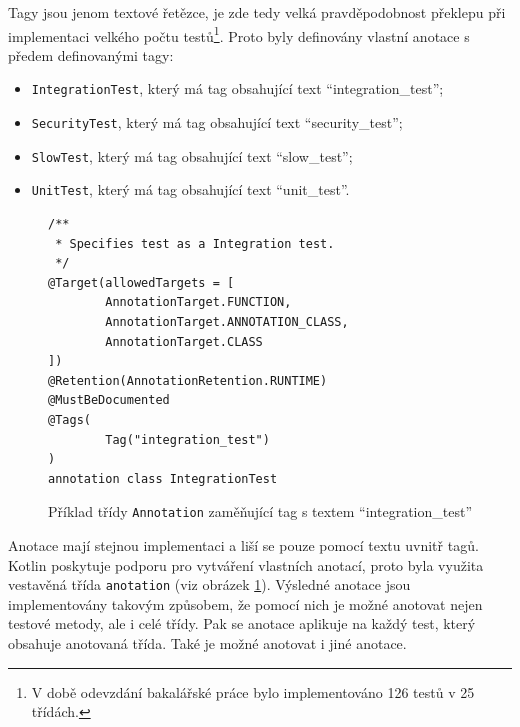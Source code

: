     Tagy jsou jenom textové řetězce, je zde tedy velká pravděpodobnost překlepu při implementaci velkého počtu testů\footnote{V době odevzdání bakalářské práce bylo implementováno 126 testů v 25 třídách.}. Proto byly definovány vlastní anotace s předem definovanými tagy:
    \begin{itemize}
            \item \verb|IntegrationTest|, který má tag obsahující text \enquote{integration\_test};
            \item \verb|SecurityTest|, který má tag obsahující text \enquote{security\_test};
            \item \verb|SlowTest|, který má tag obsahující text \enquote{slow\_test};
            \item \verb|UnitTest|, který má tag obsahující text \enquote{unit\_test}.
    \end{itemize}
    
    \begin{figure}
        \begin{verbatim}
/**
 * Specifies test as a Integration test.
 */
@Target(allowedTargets = [
        AnnotationTarget.FUNCTION,
        AnnotationTarget.ANNOTATION_CLASS,
        AnnotationTarget.CLASS
])
@Retention(AnnotationRetention.RUNTIME)
@MustBeDocumented
@Tags(
        Tag("integration_test")
)
annotation class IntegrationTest
        \end{verbatim}
        \caption{Příklad třídy \texttt{Annotation} zaměňující tag s textem \enquote{integration\_test}} 
        \label{code:annotation-class}
    \end{figure}
    Anotace mají stejnou implementaci a liší se pouze pomocí textu uvnitř tagů. Kotlin poskytuje podporu pro vytváření vlastních anotací, proto byla využita vestavěná třída \verb|anotation| (viz obrázek \ref{code:annotation-class}). Výsledné anotace jsou implementovány takovým způsobem, že pomocí nich je možné anotovat nejen testové metody, ale i celé třídy. Pak se anotace aplikuje na každý test, který obsahuje anotovaná třída. Také je možné anotovat i jiné anotace.

